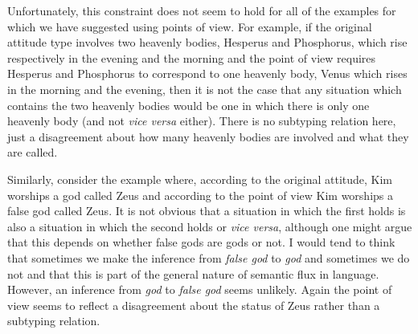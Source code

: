 Unfortunately, this constraint does not seem to hold for all of the
examples for which we have suggested using points of view.  For
example, if the original attitude type involves two heavenly bodies,
Hesperus and Phosphorus, which rise respectively in the evening and
the morning and the point of view requires Hesperus and Phosphorus to
correspond to one heavenly body, Venus which rises in the morning and
the evening, then it is not the case that any situation which contains
the two heavenly bodies would be one in which there is only one
heavenly body (and not \textit{vice versa} either).  There is no
subtyping relation here, just a disagreement about how many heavenly
bodies are involved and what they are called.

Similarly, consider the example where, according to the original
attitude, Kim worships a god called Zeus and according to the point of
view Kim worships a false god called Zeus.  It is not obvious that a
situation in which the first holds is also a situation in which the
second holds or \textit{vice versa}, although one might argue that
this depends on whether false gods are gods or not.  I would tend to
think that sometimes we make the inference from \textit{false god} to
\textit{god} and sometimes we do not and that this is part of the
general nature of semantic flux in language.  However, an inference
from \textit{god} to \textit{false god} seems unlikely.  Again the
point of view seems to reflect a disagreement about the status of Zeus
rather than a subtyping relation.

